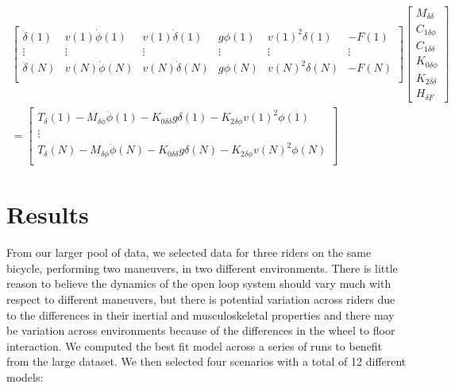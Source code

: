 \documentclass[a4paper]{article}
\begin{document}
\begin{align}
  \begin{bmatrix}
    \ddot{\delta}(1) &
    v(1) \dot{\phi}(1) &
    v(1) \dot{\delta}(1) &
    g \phi(1) &
    v(1)^2 \delta(1) &
    - F(1)\\
    \vdots & \vdots & \vdots & \vdots & \vdots & \vdots \\
    \ddot{\delta}(N) &
    v(N) \dot{\phi}(N) &
    v(N) \dot{\delta}(N) &
    g \phi(N) &
    v(N)^2 \delta(N) &
    - F(N)\\
  \end{bmatrix}
  \begin{bmatrix}
    M_{\delta\delta} \\
    C_{1\delta\phi} \\
    C_{1\delta\delta} \\
    K_{0\delta\phi} \\
    K_{2\delta\delta} \\
    H_{\delta F}
  \end{bmatrix} \nonumber \\
  =
  \begin{bmatrix}
    T_\delta(1)
    - M_{\delta\phi} \ddot{\phi}(1)
    - K_{0\delta\delta} g \delta(1)
    - K_{2\delta\phi} v(1)^2 \phi(1) \\
    \vdots\\
    T_\delta(N)
    - M_{\delta\phi} \ddot{\phi}(N)
    - K_{0\delta\delta} g \delta(N)
    - K_{2\delta\phi} v(N)^2 \phi(N) \\
  \end{bmatrix}
\end{align}

\section{Results}

From our larger pool of data, we selected data for three riders on the same
bicycle, performing two maneuvers, in two different environments. There is
little reason to believe the dynamics of the open loop system should vary much
with respect to different maneuvers, but there is potential variation across
riders due to the differences in their inertial and musculoskeletal properties
and there may be variation across environments because of the differences in
the wheel to floor interaction. We computed the best fit model across a series
of runs to benefit from the large dataset. We then selected four scenarios with
a total of 12 different models:
\end{document}
